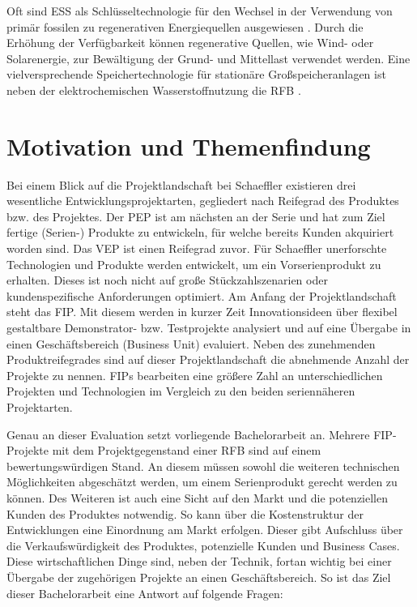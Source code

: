 Oft sind \acs{ESS} als Schlüsseltechnologie für den Wechsel in der Verwendung von primär fossilen zu regenerativen Energiequellen ausgewiesen \cite{Wess.2013, Zhan.2018, Ster.2016,Zapf.2017}. Durch die Erhöhung der Verfügbarkeit können regenerative Quellen, wie Wind- oder Solarenergie, zur Bewältigung der Grund- und Mittellast verwendet werden. Eine vielversprechende Speichertechnologie für stationäre Großspeicheranlagen ist neben der elektrochemischen Wasserstoffnutzung die \ac{RFB} \cite{Zhan.2018, Ster.2016}.

\section*{Motivation und Themenfindung}
\label{sec:themenfindung}
Bei einem Blick auf die Projektlandschaft bei Schaeffler existieren drei wesentliche Entwicklungsprojektarten, gegliedert nach Reifegrad des Produktes bzw. des Projektes. Der \ac{PEP} ist am nächsten an der Serie und hat zum Ziel fertige (Serien-) Produkte zu entwickeln, für welche bereits Kunden akquiriert worden sind. Das \ac{VEP} ist einen Reifegrad zuvor. Für Schaeffler unerforschte Technologien und Produkte werden entwickelt, um ein Vorserienprodukt zu erhalten. Dieses ist noch nicht auf große Stückzahlszenarien oder kundenspezifische Anforderungen optimiert. Am Anfang der Projektlandschaft steht das \ac{FIP}. Mit diesem werden in kurzer Zeit Innovationsideen über flexibel gestaltbare Demonstrator- bzw. Testprojekte analysiert und auf eine Übergabe in einen Geschäftsbereich (Business Unit) evaluiert. Neben des zunehmenden Produktreifegrades sind auf dieser Projektlandschaft die abnehmende Anzahl der Projekte zu nennen. \acp{FIP} bearbeiten eine größere Zahl an unterschiedlichen Projekten und Technologien im Vergleich zu den beiden seriennäheren Projektarten.

Genau an dieser Evaluation setzt vorliegende Bachelorarbeit an. Mehrere \acs{FIP}-Projekte mit dem Projektgegenstand einer \acs{RFB} sind auf einem bewertungswürdigen Stand. An diesem müssen sowohl die weiteren technischen Möglichkeiten abgeschätzt werden, um einem Serienprodukt gerecht werden zu können. Des Weiteren ist auch eine Sicht auf den Markt und die potenziellen Kunden des Produktes notwendig. So kann über die Kostenstruktur der Entwicklungen eine Einordnung am Markt erfolgen. Dieser gibt Aufschluss über die Verkaufswürdigkeit des Produktes, potenzielle Kunden und Business Cases. Diese wirtschaftlichen Dinge sind, neben der Technik, fortan wichtig bei einer Übergabe der zugehörigen Projekte an einen Geschäftsbereich. So ist das Ziel dieser Bachelorarbeit eine Antwort auf folgende Fragen:

